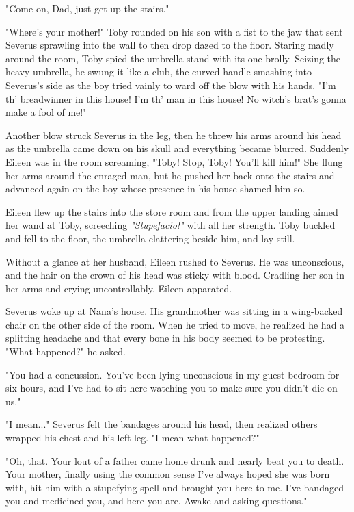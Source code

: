 \documentclass[a4paper,11pt]{article}
\begin{document}
"Come on, Dad, just get up the stairs."

"Where's your mother!" Toby rounded on his son with a fist to the jaw that sent Severus sprawling into the wall to then drop dazed to the floor. Staring madly around the room, Toby spied the umbrella stand with its one brolly. Seizing the heavy umbrella, he swung it like a club, the curved handle smashing into Severus's side as the boy tried vainly to ward off the blow with his hands. "I'm th' breadwinner in this house! I'm th' man in this house! No witch's brat's gonna make a fool of me!"

Another blow struck Severus in the leg, then he threw his arms around his head as the umbrella came down on his skull and everything became blurred. Suddenly Eileen was in the room screaming, "Toby! Stop, Toby! You'll kill him!" She flung her arms around the enraged man, but he pushed her back onto the stairs and advanced again on the boy whose presence in his house shamed him so.

Eileen flew up the stairs into the store room and from the upper landing aimed her wand at Toby, screeching \emph{"Stupefacio!"} with all her strength. Toby buckled and fell to the floor, the umbrella clattering beside him, and lay still.

Without a glance at her husband, Eileen rushed to Severus. He was unconscious, and the hair on the crown of his head was sticky with blood. Cradling her son in her arms and crying uncontrollably, Eileen apparated.

Severus woke up at Nana's house. His grandmother was sitting in a wing-backed chair on the other side of the room. When he tried to move, he realized he had a splitting headache and that every bone in his body seemed to be protesting. "What happened?" he asked.

"You had a concussion. You've been lying unconscious in my guest bedroom for six hours, and I've had to sit here watching you to make sure you didn't die on us."

"I mean..." Severus felt the bandages around his head, then realized others wrapped his chest and his left leg. "I mean what happened?"

"Oh, that. Your lout of a father came home drunk and nearly beat you to death. Your mother, finally using the common sense I've always hoped she was born with, hit him with a stupefying spell and brought you here to me. I've bandaged you and medicined you, and here you are. Awake and asking questions."
\end{document}
